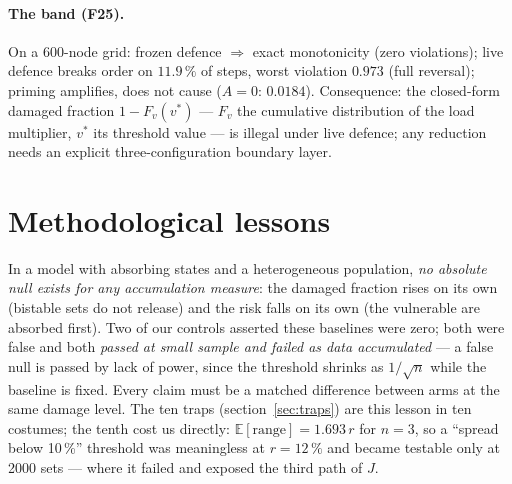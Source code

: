 \documentclass[11pt,a4paper]{article}
\theoremstyle{remark}
\begin{document}
\paragraph{The band (F25).} On a 600-node grid: frozen defence $\Rightarrow$ exact
monotonicity (zero violations); live defence breaks order on $11.9\,\%$ of steps, worst
violation $0.973$ (full reversal); priming amplifies, does not cause ($A=0$:
$0.0184$). Consequence: the closed-form damaged fraction $1-F_v(v^*)$ --- $F_v$ the cumulative
distribution of the load multiplier, $v^*$ its threshold value --- is illegal under
live defence; any reduction needs an explicit three-configuration boundary layer.

\section{Methodological lessons}\label{sec:lessons}
In a model with absorbing states and a heterogeneous population, \emph{no absolute null
exists for any accumulation measure}: the damaged fraction rises on its own (bistable
sets do not release) and the risk falls on its own (the vulnerable are absorbed
first). Two of our controls asserted these baselines were zero; both were false and
both \emph{passed at small sample and failed as data accumulated} --- a false null is
passed by lack of power, since the threshold shrinks as $1/\sqrt{n}$ while the baseline
is fixed. Every claim must be a matched difference between arms at the same damage
level. The ten traps (section~\ref{sec:traps}) are this lesson in ten costumes; the tenth cost
us directly: $\mathbb{E}[\text{range}]=1.693\,r$ for $n=3$, so a ``spread below 10\,\%''
threshold was meaningless at $r=12\,\%$ and became testable only at 2000 sets --- where it
failed and exposed the third path of $J$.
\end{document}
